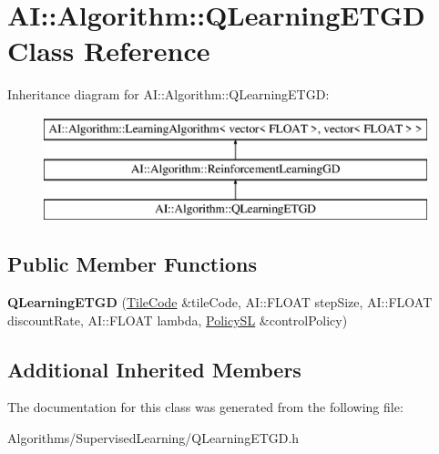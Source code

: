 \hypertarget{classAI_1_1Algorithm_1_1QLearningETGD}{\section{A\-I\-:\-:Algorithm\-:\-:Q\-Learning\-E\-T\-G\-D Class Reference}
\label{classAI_1_1Algorithm_1_1QLearningETGD}
}
Inheritance diagram for A\-I\-:\-:Algorithm\-:\-:Q\-Learning\-E\-T\-G\-D\-:\begin{figure}[H]
\begin{center}
\leavevmode
\includegraphics[height=3.000000cm]{classAI_1_1Algorithm_1_1QLearningETGD}
\end{center}
\end{figure}
\subsection*{Public Member Functions}
\begin{DoxyCompactItemize}
\item 
\hypertarget{classAI_1_1Algorithm_1_1QLearningETGD_af809fcbeb278128ba61f6f0249675d46}{{\bfseries Q\-Learning\-E\-T\-G\-D} (\hyperlink{classAI_1_1Algorithm_1_1TileCode}{Tile\-Code} \&tile\-Code, A\-I\-::\-F\-L\-O\-A\-T step\-Size, A\-I\-::\-F\-L\-O\-A\-T discount\-Rate, A\-I\-::\-F\-L\-O\-A\-T lambda, \hyperlink{classAI_1_1Algorithm_1_1Policy}{Policy\-S\-L} \&control\-Policy)}\label{classAI_1_1Algorithm_1_1QLearningETGD_af809fcbeb278128ba61f6f0249675d46}

\end{DoxyCompactItemize}
\subsection*{Additional Inherited Members}


The documentation for this class was generated from the following file\-:\begin{DoxyCompactItemize}
\item 
Algorithms/\-Supervised\-Learning/Q\-Learning\-E\-T\-G\-D.\-h\end{DoxyCompactItemize}
